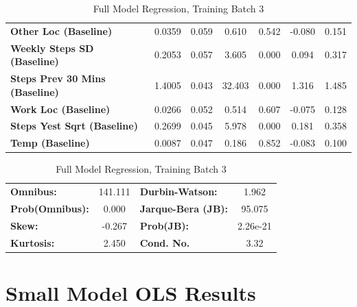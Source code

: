 \begin{table}
\begin{tabular}{lcccccc}
\textbf{Other Loc (Baseline)}          &       0.0359  &        0.059     &     0.610  &         0.542        &       -0.080    &        0.151     \\
\textbf{Weekly Steps SD (Baseline)}    &       0.2053  &        0.057     &     3.605  &         0.000        &        0.094    &        0.317     \\
\textbf{Steps Prev 30 Mins (Baseline)} &       1.4005  &        0.043     &    32.403  &         0.000        &        1.316    &        1.485     \\
\textbf{Work Loc (Baseline)}           &       0.0266  &        0.052     &     0.514  &         0.607        &       -0.075    &        0.128     \\
\textbf{Steps Yest Sqrt (Baseline)}    &       0.2699  &        0.045     &     5.978  &         0.000        &        0.181    &        0.358     \\
\textbf{Temp (Baseline)}               &       0.0087  &        0.047     &     0.186  &         0.852        &       -0.083    &        0.100     \\
\bottomrule
\end{tabular}
\begin{tabular}{lclc}
\textbf{Omnibus:}       & 141.111 & \textbf{  Durbin-Watson:     } &    1.962  \\
\textbf{Prob(Omnibus):} &   0.000 & \textbf{  Jarque-Bera (JB):  } &   95.075  \\
\textbf{Skew:}          &  -0.267 & \textbf{  Prob(JB):          } & 2.26e-21  \\
\textbf{Kurtosis:}      &   2.450 & \textbf{  Cond. No.          } &     3.32  \\
\bottomrule
\end{tabular}
\caption{Full Model Regression, Training Batch 3}
\end{table}


\newpage

\section{Small Model OLS Results}


